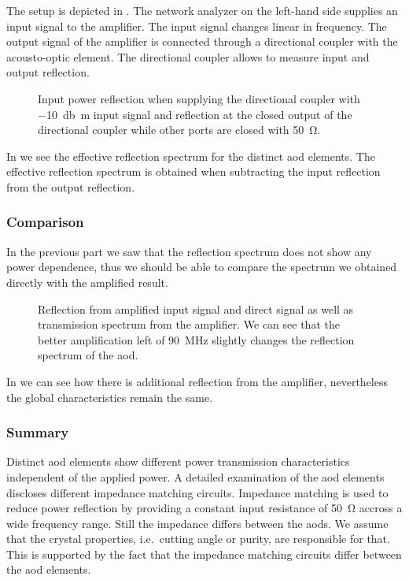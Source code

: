 The setup is depicted in .
The network analyzer on the left-hand side supplies an input signal to the
amplifier. The input signal changes linear in frequency. The output signal
of the amplifier is connected through a directional coupler with the
acousto-optic element. The directional coupler allows to measure input and
output reflection.
\begin{figure}[htb]
  \centering
  \begin{adjustbox}{width=\textwidth}
    
  \end{adjustbox}
  \caption{Input power reflection when supplying the directional coupler with
    \SI{-10}{\decibel\meter} input signal and reflection at the closed output
    of the directional coupler while other ports are closed with
    \SI{50}{\ohm}.
  }\label{fig:signal_reflection_coupler}
\end{figure}
In  we see the effective reflection
spectrum for the distinct \gls{aod} elements. The effective reflection
spectrum is obtained when subtracting the input reflection from the output
reflection.

\subsubsection{Comparison}

In the previous part we saw that the reflection spectrum does not show any
power dependence, thus we should be able to compare the spectrum we obtained
directly with the amplified result.
\begin{figure}[htb]
  \centering
  \begin{adjustbox}{width=\textwidth}
    
  \end{adjustbox}
  \caption{Reflection from amplified input signal and direct signal as well as
    transmission spectrum from the amplifier. We can see that the better
    amplification left of \SI{90}{\mega\hertz} slightly changes the reflection
    spectrum of the \gls{aod}.
  }\label{fig:signal_reflection_comparison}
\end{figure}
In  we can see how there is additional
reflection from the amplifier, nevertheless the global characteristics remain
the same.

\subsubsection{Summary}

Distinct \gls{aod} elements show different power transmission characteristics
independent of the applied power. A detailed examination of the \gls{aod}
elements discloses different impedance matching circuits. Impedance matching
is used to reduce power reflection by providing a constant input resistance
of \SI{50}{\ohm} accross a wide frequency range. Still the impedance
differs between the \gls{aod}s. We assume that the crystal properties,
i.e.\ cutting angle or purity, are responsible for that. This is supported by
the fact that the impedance matching circuits differ between the \gls{aod}
elements.

